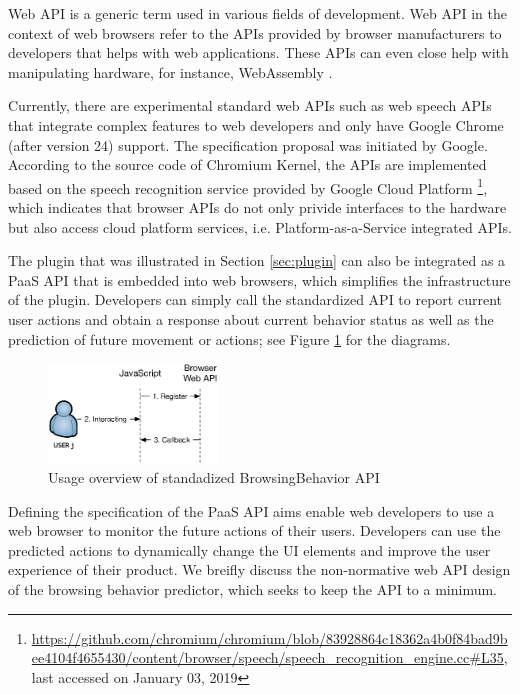 Web API is a generic term used in various fields of development.
Web API in the context of web browsers refer to the APIs provided
by browser manufacturers to developers that helps with web applications.
These APIs can even close
help with manipulating hardware, for instance, WebAssembly \cite{w3c2018ws}.

Currently, there are experimental standard web APIs such as web speech APIs \cite{mozilla2019speech}
that integrate complex features to web developers and only have 
Google Chrome (after version 24) support. 
The specification proposal was initiated by Google. According to 
the source code of Chromium Kernel, the APIs are implemented based on 
the speech recognition service provided by Google Cloud Platform 
\footnote{\url{https://github.com/chromium/chromium/blob/83928864c18362a4b0f84bad9bee4104f4655430/content/browser/speech/speech\_recognition\_engine.cc\#L35}, last accessed on January 03, 2019},
which indicates that browser APIs do not only privide interfaces to
the hardware but also access cloud platform services, i.e. Platform-as-a-Service integrated 
APIs.

The plugin that was illustrated in Section \ref{sec:plugin} can also be integrated as a PaaS API
that is embedded into web browsers, which simplifies the infrastructure of the plugin. 
Developers can simply call the standardized API to report current user actions and
obtain a response about current behavior status as well as the prediction of future movement or 
actions; see Figure \ref{fig:webapi} for the diagrams.

\begin{figure}[H]
    \centering
    \includegraphics[width=0.4\textwidth]{figures/webapi}
    \caption{Usage overview of standadized BrowsingBehavior API}
    \label{fig:webapi}
\end{figure}

Defining the specification of the PaaS API aims enable web developers to
use a web browser to monitor the future actions of their users.
Developers can use the predicted actions to dynamically change the UI elements
and improve
the user experience of their product. 
We breifly discuss the non-normative web API design of the browsing behavior predictor,
which seeks to keep the API to a minimum. 

